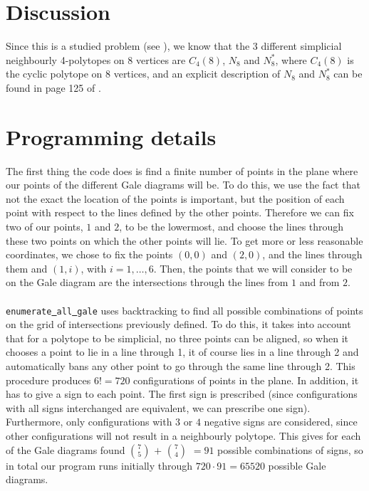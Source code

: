 \documentclass[paper=a4, fontsize=11pt]{scrartcl} %
\theoremstyle{definition}
\begin{document}
\section{Discussion}
Since this is a studied problem (see \cite{GrSr67}), we know that the 3 different simplicial neighbourly 4-polytopes on 8 vertices are $C_4(8)$, $N_8$ and $N_8^*$, where $C_4(8)$ is the cyclic polytope on 8 vertices, and an explicit description of $N_8$ and $N_8^*$ can be found in page 125 of \cite{Gr03}.


\section{Programming details}
The first thing the code does is find a finite number of points in the plane where our points of the different Gale diagrams will be. To do this, we use the fact that not the exact the location of the points is important, but the position of each point with respect to the lines defined by the other points. Therefore we can fix two of our points, $1$ and $2$, to be the lowermost, and choose the lines through these two points on which the other points will lie. To get more or less reasonable coordinates, we chose to fix the points $(0,0)$ and $(2,0)$, and the lines through them and $(1,i)$, with $i =1,\ldots,6$. Then, the points that we will consider to be on the Gale diagram are the intersections through the lines from $1$ and from $2$.\\
\\
\texttt{enumerate\underline{ }all\underline{ }gale} uses backtracking to find all possible combinations of  points on the grid of intersections previously defined. To do this, it takes into account that for a polytope to be simplicial, no three points can be aligned, so when it chooses a point to lie in a line through 1, it of course lies in a line through 2 and automatically bans any other point to go through the same line through 2. This procedure produces $6! = 720$ configurations of points in the plane. In addition, it has to give a sign to each point. The first sign is prescribed (since configurations with all signs interchanged are equivalent, we can prescribe one sign). Furthermore, only configurations with $3$ or $4$ negative signs are considered, since other configurations will not result in a neighbourly polytope. This gives for each of the Gale diagrams found $7\choose 5$ $+$ $7\choose 4$ $= 91$ possible combinations of signs, so in total our program runs initially through $720\cdot 91 = 65520$ possible Gale diagrams.\\
\end{document}
